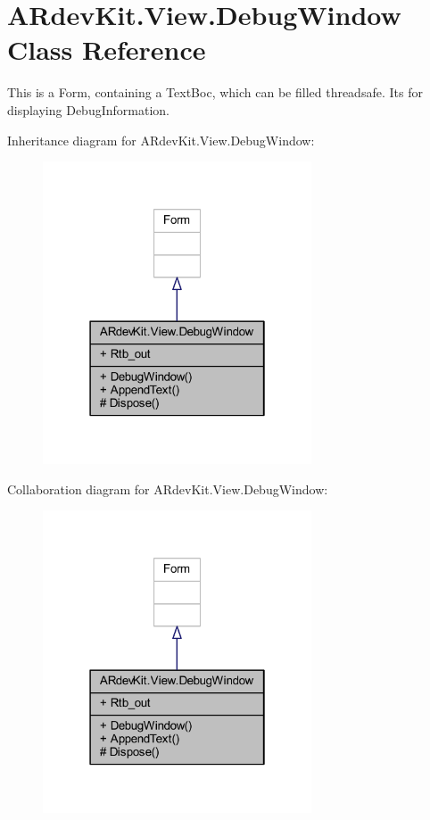 \hypertarget{class_a_rdev_kit_1_1_view_1_1_debug_window}{\section{A\-Rdev\-Kit.\-View.\-Debug\-Window Class Reference}
\label{class_a_rdev_kit_1_1_view_1_1_debug_window}
}


This is a Form, containing a Text\-Boc, which can be filled threadsafe. Its for displaying Debug\-Information.  




Inheritance diagram for A\-Rdev\-Kit.\-View.\-Debug\-Window\-:
\nopagebreak
\begin{figure}[H]
\begin{center}
\leavevmode
\includegraphics[width=226pt]{class_a_rdev_kit_1_1_view_1_1_debug_window__inherit__graph}
\end{center}
\end{figure}


Collaboration diagram for A\-Rdev\-Kit.\-View.\-Debug\-Window\-:
\nopagebreak
\begin{figure}[H]
\begin{center}
\leavevmode
\includegraphics[width=226pt]{class_a_rdev_kit_1_1_view_1_1_debug_window__coll__graph}
\end{center}
\end{figure}
